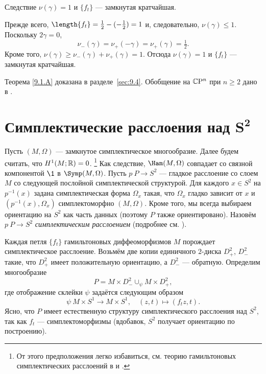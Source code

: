 \begin{thm}[(\cite{LM2})]{Следствие} $\nu(\gamma) = 1$ и $\{f_t\}$ —
  замкнутая кратчайшая.
\end{thm}

Прежде всего, $\length\{f_t\} =\frac12 - (-\frac12 ) = 1$ и,
следовательно, $\nu(\gamma) \le 1$. 
Поскольку $2\gamma = 0$, 
\[\nu_- (\gamma) = \nu_+ (-\gamma) = \nu_+ (\gamma) =\tfrac12.\]
Кроме того, $\nu(\gamma) \ge \nu_- (\gamma) + \nu_+ (\gamma) = 1$.
Отсюда $\nu(\gamma) = 1$ и $\{f_t\}$ — замкнутая кратчайшая.
\qeds

Теорема \ref{9.1.A} доказана в разделе~\ref{sec:9.4}.
Обобщение на $\mathbb{C}\mathrm{P}^n$ при $n \ge 2$ дано в \cite{P3}.

\section[\texorpdfstring{Симплектические расслоения над
    $S^2$}{Симплектические расслоения над S²}]{Симплектические
  расслоения над $\bm{S^2}$} 
\label{sec:9.2}

Пусть $(M, \Omega)$ — замкнутое симплектическое многообразие.
Далее будем считать, что $H^1 (M;\mathbb{R}) = 0$.%
\footnote{От этого предположения легко избавиться, см. теорию
  гамильтоновых симплектических расслоений в \cite{MS} и \cite{P4}.} 
Как следствие, $\Ham(M, \Omega)$ совпадает со связной компонентой $\1$
в $\Symp(M, \Omega)$. 
Пусть $p \: P \to S^2$ — гладкое расслоение со слоем $M$ со
следующей послойной симплектической структурой.
Для каждого $x \in S^2$ на $p^{-1} (x)$ задана симплектическая форма
$\Omega_x$ такая, что $\Omega_x$ гладко зависит от $x$ и $(p^{-1} (x),
\Omega_x)$  симплектоморфно $(M, \Omega)$.
Кроме того, мы всегда выбираем ориентацию на $S^2$ как часть данных
(поэтому $P$ также ориентировано).
Назовём $p\: P\to S^2$ \emph{симплектическим расслоением} (подробнее
см. \cite{MS}). 

Каждая петля $\{f_t\}$ гамильтоновых диффеоморфизмов $M$ порождает
симплектическое расслоение.
Возьмём две копии единичного $2$-диска $D_+^2$, $D_-^2$ такие, что
$D_+^2$ имеет положительную ориентацию, а $D_-^2$ — обратную.
Определим многообразие
\[P =  M  \times D_-^2 \cup_\psi M \times D_+^2,\]
где отображение склейки $\psi$ задаётся следующим образом
\[\psi \: M \times S^1 \to M \times S^1,\quad (z, t) \mapsto (f_t z, t).\]
Ясно, что $P$ имеет естественную структуру симплектического расслоения
над $S^2$, так как $f_t$ — симплектоморфизмы (вдобавок, $S^2$
получает ориентацию по построению).

